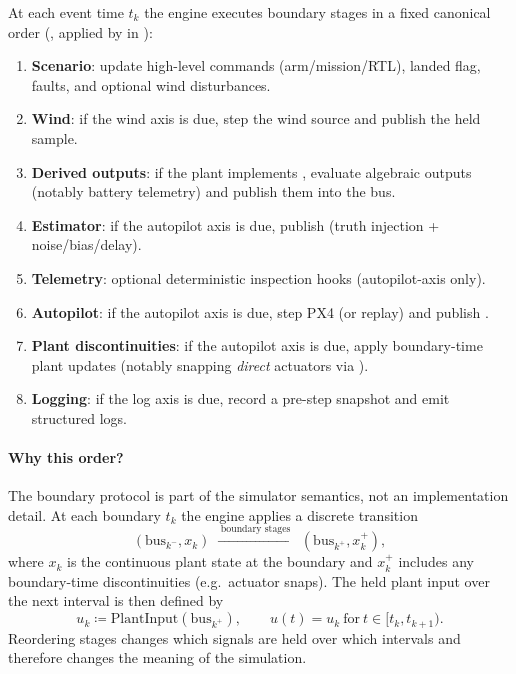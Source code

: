 At each event time $t_k$ the engine executes boundary stages in a fixed canonical order (, applied by  in ):
\begin{enumerate}[leftmargin=*,itemsep=2pt]
  \item \textbf{Scenario}: update high-level commands (arm/mission/RTL), landed flag, faults, and optional wind disturbances.
  \item \textbf{Wind}: if the wind axis is due, step the wind source and publish the held  sample.
  \item \textbf{Derived outputs}: if the plant implements , evaluate algebraic outputs (notably battery telemetry) and publish them into the bus.
  \item \textbf{Estimator}: if the autopilot axis is due, publish  (truth injection + noise/bias/delay).
  \item \textbf{Telemetry}: optional deterministic inspection hooks (autopilot-axis only).
  \item \textbf{Autopilot}: if the autopilot axis is due, step PX4 (or replay) and publish .
  \item \textbf{Plant discontinuities}: if the autopilot axis is due, apply boundary-time plant updates (notably snapping \emph{direct} actuators via ).
  \item \textbf{Logging}: if the log axis is due, record a pre-step snapshot and emit structured logs.
\end{enumerate}

\paragraph{Why this order?}
The boundary protocol is part of the simulator semantics, not an implementation detail. At each boundary \(t_k\) the engine applies a discrete transition
\[
  (\mathrm{bus}_{k^-}, x_k) \;\xrightarrow{\;\text{boundary stages}\;}\; (\mathrm{bus}_{k^+}, x_k^+),
\]
where \(x_k\) is the continuous plant state at the boundary and \(x_k^+\) includes any boundary-time discontinuities (e.g.\ actuator snaps). The held plant input over the next interval is then defined by
\[
  u_k \coloneqq \mathrm{PlantInput}(\mathrm{bus}_{k^+}),\qquad
  u(t)=u_k\ \text{for}\ t\in[t_k,t_{k+1}).
\]
Reordering stages changes which signals are held over which intervals and therefore changes the meaning of the simulation.

